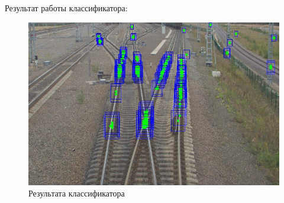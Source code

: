 Результат работы классификатора:
\begin{figure}[!h]
	\centering
	\includegraphics[width=0.7\linewidth]{pictures/screenshot2324}
	\caption{Результата классификатора}
	\label{fig:screenshot2324}
\end{figure}

